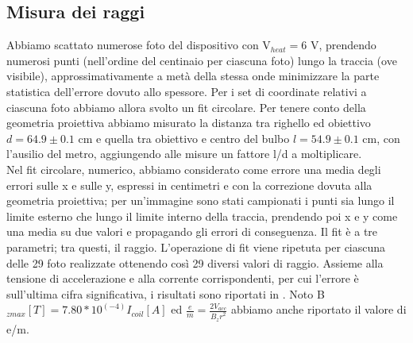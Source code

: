 \subsection{Misura dei raggi}
Abbiamo scattato numerose foto del dispositivo con V$_{heat} = 6$ V, prendendo numerosi punti (nell'ordine del centinaio per ciascuna foto) lungo la traccia (ove visibile), approssimativamente a metà della stessa onde minimizzare la parte statistica dell'errore dovuto allo spessore. Per i set di coordinate relativi a ciascuna foto abbiamo allora svolto un fit circolare. Per tenere conto della geometria proiettiva abbiamo misurato la distanza tra righello ed obiettivo $d=64.9 \pm 0.1$ cm e quella tra obiettivo e centro del bulbo $l=54.9 \pm 0.1$ cm, con l'ausilio del metro, aggiungendo alle misure un fattore l/d a moltiplicare.\\
Nel fit circolare, numerico, abbiamo considerato come errore una media degli errori sulle x e sulle y, espressi in centimetri e con la correzione dovuta alla geometria proiettiva; per un'immagine sono stati campionati i punti sia lungo il limite esterno che lungo il limite interno della traccia, prendendo poi x e y come una media su due valori e propagando gli errori di conseguenza. Il fit è a tre parametri; tra questi, il raggio. L'operazione di fit viene ripetuta per ciascuna delle 29 foto realizzate ottenendo così 29 diversi valori di raggio. Assieme alla tensione di accelerazione e alla corrente corrispondenti, per cui l'errore è sull'ultima cifra significativa, i risultati sono riportati in . Noto B$_{zmax}[T] = 7.80*10^(-4)I_{coil}[A]$ ed $\frac{e}{m}= \frac{2V_{acc}}{{B_{z}r}^2}$ abbiamo anche riportato il valore di e/m.\\
